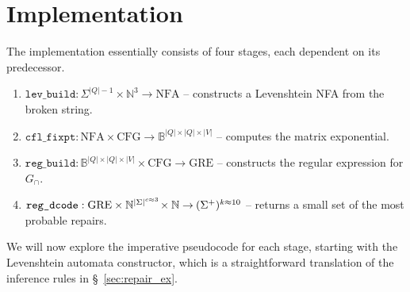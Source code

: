 \documentclass[sigplan,review,acmsmall,nonacm,screen,anonymous]{acmart}\settopmatter{printfolios=false,printccs=false,printacmref=false}
\begin{document}
\clearpage\section{Implementation}\label{sec:implementation}

The implementation essentially consists of four stages, each dependent on its predecessor.

\begin{enumerate}
  \item $\texttt{lev\_build}: \Sigma^{|Q|-1} \times \mathbb{N}^{3} \rightarrow \text{NFA}$ -- constructs a Levenshtein NFA from the broken string.
  \item $\texttt{cfl\_fixpt}: \text{NFA} \times \text{CFG} \rightarrow \mathbb{B}^{|Q|\times |Q| \times |V|}$ -- computes the matrix exponential.
  \item $\texttt{reg\_build}: \mathbb{B}^{|Q|\times |Q| \times |V|} \times \text{CFG} \rightarrow \text{GRE}$ -- constructs the regular expression for $G_\cap$.
  \item $\texttt{reg\_dcode}: \text{GRE} \times \mathbb{N}^{|\Sigma|^{c\approx 3}} \hspace{-0.05cm}\times \mathbb{N} \rightarrow\hspace{-0.02cm} (\Sigma^+)^{k\approx 10}$ -- returns a small set of the most probable repairs.
\end{enumerate}

\noindent We will now explore the imperative pseudocode for each stage, starting with the Levenshtein automata constructor, which is a straightforward translation of the inference rules in \S~\ref{sec:repair_ex}.
\end{document}
